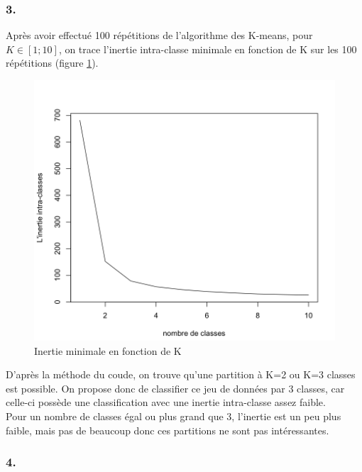 \documentclass{article}
\begin{document}
\subsubsection*{3.}\label{3.1.3}
Après avoir effectué 100 répétitions de l'algorithme des K-means, pour $K \in [1;10]$, on trace l'inertie intra-classe minimale en fonction de K sur les 100 répétitions (figure \ref{iris_inertie_min}).\\

\begin{figure}[H]
\centering
\includegraphics[scale=0.235]{./img/iris_inertie_min.png}
\caption{Inertie minimale en fonction de K}
\label{iris_inertie_min}
\end{figure}

D'après la méthode du coude, on trouve qu'une partition à K=2 ou K=3 classes est possible. On propose donc de classifier ce jeu de données par 3 classes, car celle-ci possède une classification avec une inertie intra-classe assez faible.\\
Pour un nombre de classes égal ou plus grand que 3, l'inertie est un peu plus faible, mais pas de beaucoup donc ces partitions ne sont pas intéressantes.

\subsubsection*{4.}
\end{document}
